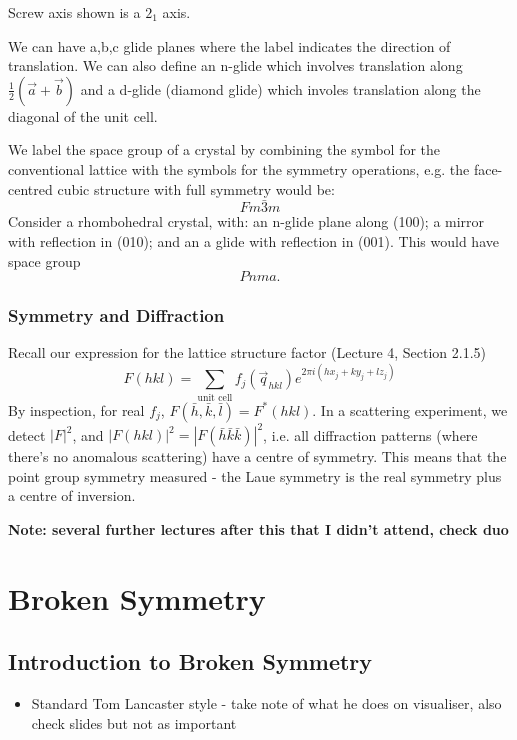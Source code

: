 \documentclass[a4paper, 11pt, normalem]{report}
\begin{document}
Screw axis shown is a $2_1$ axis.

We can have a,b,c glide planes where the label indicates the direction of translation.
We can also define an n-glide which involves translation along $\frac{1}{2}(\vec{a}+\vec{b})$ and a d-glide (diamond glide) which involes translation along the diagonal of the unit cell.

We label the space group of a crystal by combining the symbol for the conventional lattice with the symbols for the symmetry operations, e.g. the face-centred cubic structure with full symmetry would be:
\begin{equation}
    Fm\bar{3}m
\end{equation}
Consider a rhombohedral crystal, with: an n-glide plane along (100); a mirror with reflection in (010); and an a glide with reflection in (001).
This would have space group
\begin{equation}
    Pnma.
\end{equation}

\section{Symmetry and Diffraction}
Recall our expression for the lattice structure factor (Lecture 4, Section 2.1.5)
\begin{equation}
    F(hkl) = \sum_{\text{unit cell}} f_j(\vec{q}_{hkl})e^{2\pi i(hx_j + ky_j + lz_j)}
\end{equation}
By inspection, for real $f_j$, $F(\bar{h},\bar{k},\bar{l}) = F^*(hkl)$.
In a scattering experiment, we detect $|F|^2$, and $|F(hkl)|^2 = |F(\bar{h}\bar{k}\bar{k})|^2$, i.e. all diffraction patterns (where there's no anomalous scattering) have a centre of symmetry.
This means that the point group symmetry measured - the Laue symmetry is the real symmetry plus a centre of inversion.

\textbf{Note: several further lectures after this that I didn't attend, check duo}


\part{Broken Symmetry}
\chapter{Introduction to Broken Symmetry}
\begin{itemize}
    \item Standard Tom Lancaster style - take note of what he does on visualiser, also check slides but not as important
\end{itemize}
\end{document}
